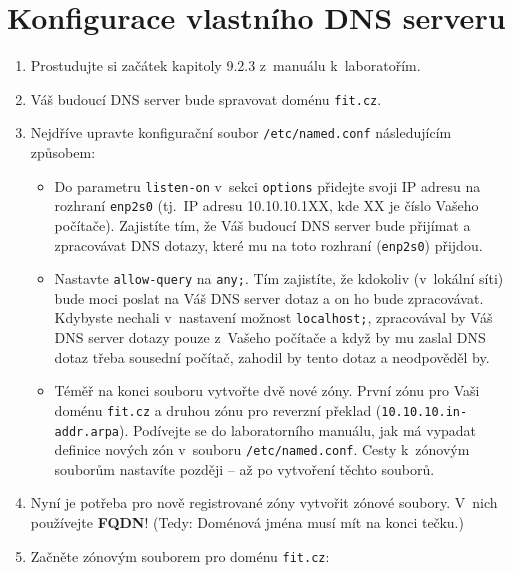 \section{Konfigurace vlastního DNS serveru}
\begin{enumerate}
  \item Prostudujte si začátek kapitoly 9.2.3 z~manuálu k~laboratořím.
  \item Váš budoucí DNS server bude spravovat doménu  {\tt fit.cz}.
  \item Nejdříve upravte konfigurační soubor {\tt /etc/named.conf} následujícím způsobem:
    \begin{itemize}
      \item Do parametru {\tt listen-on} v~sekci {\tt options} přidejte svoji IP adresu na rozhraní {\tt enp2s0}
            (tj.~IP adresu 10.10.10.1XX, kde XX je číslo Vašeho počítače).
            Zajistíte tím, že Váš budoucí DNS server bude přijímat a zpracovávat DNS dotazy, které mu na toto rozhraní ({\tt enp2s0}) přijdou. 
      \item Nastavte {\tt allow-query} na {\tt any;}.
            Tím zajistíte, že kdokoliv (v~lokální síti) bude moci poslat na Váš DNS server dotaz a on ho bude zpracovávat.
            Kdybyste nechali v~nastavení možnost {\tt localhost;}, zpracovával by Váš DNS server dotazy pouze z~Vašeho počítače a
            když by mu zaslal DNS dotaz třeba sousední počítač, zahodil by tento dotaz a neodpověděl by.
      \item Téměř na konci souboru vytvořte dvě nové zóny. První zónu pro Vaši doménu {\tt fit.cz} a druhou zónu pro reverzní překlad ({\tt 10.10.10.in-addr.arpa}).
            Podívejte se do laboratorního manuálu, jak má vypadat definice nových zón v~souboru {\tt /etc/named.conf}.
            Cesty k~zónovým souborům nastavíte později -- až po vytvoření těchto souborů.
    \end{itemize}
  
  \item Nyní je potřeba pro nově registrované zóny vytvořit zónové soubory. V~nich používejte \textbf{FQDN}! (Tedy: Doménová jména musí mít na konci tečku.)
  \item Začněte zónovým souborem pro doménu {\tt fit.cz}:
  

\end{enumerate}
